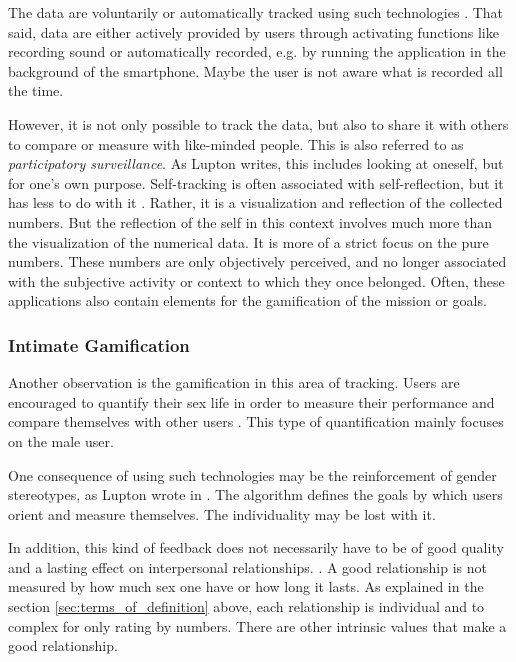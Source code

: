 The data are voluntarily or automatically tracked using such technologies \cite{doi:10.1080/15265161.2017.1409823}. That said, data are either actively provided by users through activating functions like recording sound or automatically recorded, e.g. by running the application in the background of the smartphone. Maybe the user is not aware what is recorded all the time. 

However, it is not only possible to track the data, but also to share it with others to compare or measure with like-minded people.
This is also referred to as \textit{participatory surveillance}. As Lupton \cite{doi:10.1080/13691058.2014.920528} writes, this includes looking at oneself, but for one's own purpose. Self-tracking is often associated with self-reflection, but it has less to do with it \cite{lupton2016quantified}. Rather, it is a visualization and reflection of the collected numbers. But the reflection of the self in this context involves much more than the visualization of the numerical data. It is more of a strict focus on the pure numbers. These numbers are only objectively perceived, and no longer associated with the subjective activity or context to which they once belonged.
Often, these applications also contain elements for the gamification of the mission or goals.

\subsubsection{Intimate Gamification}
Another observation is the gamification in this area of tracking. Users are encouraged to quantify their sex life in order to measure their performance and compare themselves with other users \cite{doi:10.1080/13691058.2014.920528}. This type of quantification mainly focuses on the male user.

One consequence of using such technologies may be the reinforcement of gender stereotypes, as Lupton wrote in \cite{doi:10.1080/13691058.2014.920528}. The algorithm defines the goals by which users orient and measure themselves. The individuality may be lost with it.

In addition, this kind of feedback does not necessarily have to be of good quality and a lasting effect on interpersonal relationships. \cite{doi:10.1080/15265161.2017.1409823}. A good relationship is not measured by how much sex one have or how long it lasts. As explained in the section \ref{sec:terms_of_definition} above, each relationship is individual and to complex for only rating by numbers. There are other intrinsic values that make a good relationship.

